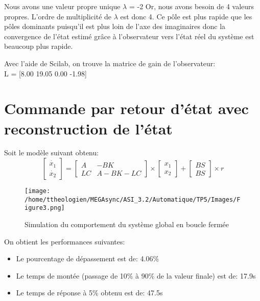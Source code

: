 \documentclass[a4paper,12pt]{article}
\begin{document}
    \par Nous avons une valeur propre unique $\lambda$ = -2
     Or, nous avons besoin de 4 valeurs propres.
     L’ordre de multiplicité de $\lambda$ est donc 4.
     Ce pôle est plus rapide que les pôles dominants puisqu'il est plus loin de l'axe des imaginaires donc la convergence de l'état estimé grâce à l'observateur vers l'état réel du système est beaucoup plus rapide.\\

    \par Avec l’aide de Scilab, on trouve la matrice de gain de l'observateur:\\
     L = [8.00 19.05 0.00 -1.98]
  \newpage

  \section{Commande par retour d'état avec reconstruction de l'état}
  \label{sec:Commande par retour d'état avec reconstruction de l'état}
    Soit le modèle suivant obtenu: \\
    \[
      \left[
            \begin{array}{c}
              \dot{x_1}\\
              \dot{x_2}
            \end{array}
      \right]
      =
      \left[
            \begin{array}{cc}
              A  & -BK\\
              LC & A-BK-LC
            \end{array}
      \right]
      \times
      \left[
            \begin{array}{c}
              x_1\\
              x_2
            \end{array}
      \right]
      +
      \left[
            \begin{array}{c}
              BS\\
              BS
            \end{array}
      \right]
      \times r
    \]

    \begin{figure}[h]
      \caption{Simulation du comportement du système global en boucle fermée}
      \centering
      \texttt{[image: /home/ttheologien/MEGAsync/ASI\_3.2/Automatique/TP5/Images/Figure3.png]}
    \end{figure}

    On obtient les performances suivantes:
    \begin{itemize}
      \item Le pourcentage de dépassement est de: 4.06\%
      \item Le temps de montée (passage de 10\% à 90\% de la valeur finale) est de: 17.9s
      \item Le temps de réponse à 5\% obtenu est de: 47.5s
    \end{itemize}
\end{document}
